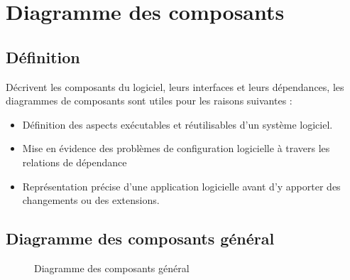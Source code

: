\documentclass[12pt]{report}
\begin{document}
\newpage

\section{Diagramme des composants}
\subsection{Définition}
\hspace*{0.16in}
Décrivent les composants du logiciel, leurs interfaces et leurs dépendances, les diagrammes de composants sont utiles pour les raisons suivantes :

\begin{itemize}
    \item Définition des aspects exécutables et réutilisables d'un système logiciel.
    \item Mise en évidence des problèmes de configuration logicielle à travers les relations de dépendance
    \item Représentation précise d'une application logicielle avant d'y apporter des changements ou des extensions.
\end{itemize}

\subsection{Diagramme des composants général}

\begin{figure}[h]
\centering
    \centerline{}
    \caption{Diagramme des composants général}
\end{figure}
\end{document}
